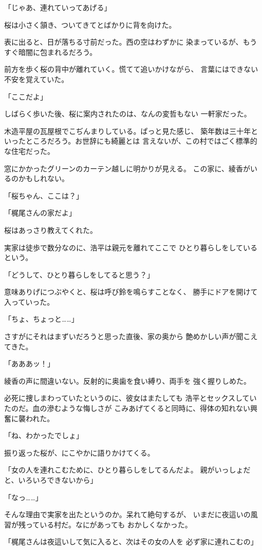 ﻿\documentclass[
    book,tate,
    line_length=30zw,
    jafontsize=12pt,
    paper=b5j,
    landscape,
    ]{jlreq}
\begin{document}
「じゃあ、連れていってあげる」

桜は小さく頷き、ついてきてとばかりに背を向けた。

表に出ると、日が落ちる寸前だった。西の空はわずかに
染まっているが、もうすぐ暗闇に包まれるだろう。

前方を歩く桜の背中が離れていく。慌てて追いかけながら、
言葉にはできない不安を覚えていた。

「ここだよ」

しばらく歩いた後、桜に案内されたのは、なんの変哲もない
一軒家だった。

木造平屋の瓦屋根でこぢんまりしている。ぱっと見た感じ、
築年数は三十年といったところだろう。お世辞にも綺麗とは
言えないが、この村ではごく標準的な住宅だった。

窓にかかったグリーンのカーテン越しに明かりが見える。
この家に、綾香がいるのかもしれない。

「桜ちゃん、ここは？」

「梶尾さんの家だよ」

桜はあっさり教えてくれた。

実家は徒歩で数分なのに、浩平は親元を離れてここで
ひとり暮らしをしているという。

「どうして、ひとり暮らしをしてると思う？」

意味ありげにつぶやくと、桜は呼び鈴を鳴らすことなく、
勝手にドアを開けて入っていった。

「ちょ、ちょっと……」

さすがにそれはまずいだろうと思った直後、家の奥から
艶めかしい声が聞こえてきた。

「あああッ！」

綾香の声に間違いない。反射的に奥歯を食い縛り、両手を
強く握りしめた。

必死に捜しまわっていたというのに、彼女はまたしても
浩平とセックスしていたのだ。血の滲むような悔しさが
こみあげてくると同時に、得体の知れない興奮に襲われた。

「ね、わかったでしょ」

振り返った桜が、にこやかに語りかけてくる。

「女の人を連れこむために、ひとり暮らしをしてるんだよ。
親がいっしょだと、いろいろできないから」

「なっ……」

そんな理由で実家を出たというのか。呆れて絶句するが、
いまだに夜這いの風習が残っている村だ。なにがあっても
おかしくなかった。

「梶尾さんは夜這いして気に入ると、次はその女の人を
必ず家に連れこむの」
\end{document}
